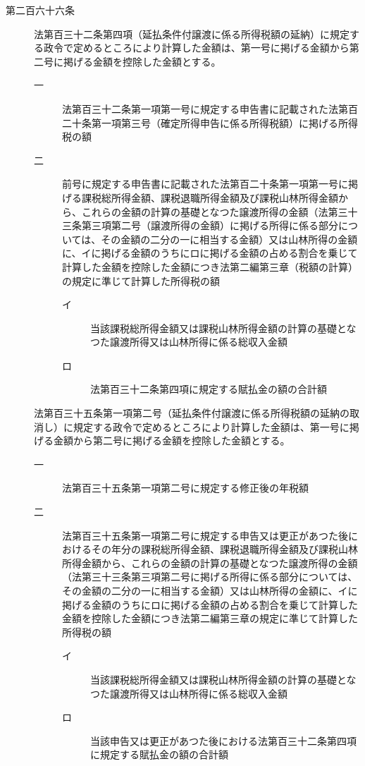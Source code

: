 \documentclass[twocolumn,a4j,10pt]{ltjtarticle}
\begin{document}
\begin{description}
\item[第二百六十六条]法第百三十二条第四項（延払条件付譲渡に係る所得税額の延納）に規定する政令で定めるところにより計算した金額は、第一号に掲げる金額から第二号に掲げる金額を控除した金額とする。
\begin{description}
\item[一]法第百三十二条第一項第一号に規定する申告書に記載された法第百二十条第一項第三号（確定所得申告に係る所得税額）に掲げる所得税の額
\item[二]前号に規定する申告書に記載された法第百二十条第一項第一号に掲げる課税総所得金額、課税退職所得金額及び課税山林所得金額から、これらの金額の計算の基礎となつた譲渡所得の金額（法第三十三条第三項第二号（譲渡所得の金額）に掲げる所得に係る部分については、その金額の二分の一に相当する金額）又は山林所得の金額に、イに掲げる金額のうちにロに掲げる金額の占める割合を乗じて計算した金額を控除した金額につき法第二編第三章（税額の計算）の規定に準じて計算した所得税の額
\begin{description}
\item[イ]当該課税総所得金額又は課税山林所得金額の計算の基礎となつた譲渡所得又は山林所得に係る総収入金額
\item[ロ]法第百三十二条第四項に規定する賦払金の額の合計額
\end{description}
\end{description}
\item[]法第百三十五条第一項第二号（延払条件付譲渡に係る所得税額の延納の取消し）に規定する政令で定めるところにより計算した金額は、第一号に掲げる金額から第二号に掲げる金額を控除した金額とする。
\begin{description}
\item[一]法第百三十五条第一項第二号に規定する修正後の年税額
\item[二]法第百三十五条第一項第二号に規定する申告又は更正があつた後におけるその年分の課税総所得金額、課税退職所得金額及び課税山林所得金額から、これらの金額の計算の基礎となつた譲渡所得の金額（法第三十三条第三項第二号に掲げる所得に係る部分については、その金額の二分の一に相当する金額）又は山林所得の金額に、イに掲げる金額のうちにロに掲げる金額の占める割合を乗じて計算した金額を控除した金額につき法第二編第三章の規定に準じて計算した所得税の額
\begin{description}
\item[イ]当該課税総所得金額又は課税山林所得金額の計算の基礎となつた譲渡所得又は山林所得に係る総収入金額
\item[ロ]当該申告又は更正があつた後における法第百三十二条第四項に規定する賦払金の額の合計額

\end{description}
\end{description}
\end{description}
\end{document}
